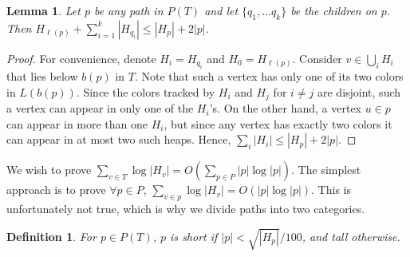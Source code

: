 \documentclass[11pt]{article}
\newcommand{\ignore}[1]{}
\newtheorem{lemma}[theorem]{Lemma}
\newtheorem{definition}[theorem]{Definition}
\theoremstyle{definition}
\newtheorem{observation}{Observation}
\begin{document}
\begin{lemma}
\label{lem:adjacent}
 Let $p$ be any path in $P(T)$ and let $\{q_1, \dots q_k\}$ be the children on $p$.
Then $H_{\ell(p)} + \sum_{i=1}^k |H_{q_i}| \leq |H_p|+2|p|$. 
\end{lemma}

\begin{proof} For convenience, denote $H_i = H_{q_i}$ and $H_0 = H_{\ell(p)}$.
Consider $v \in \bigcup_{i} H_i$ that lies below $b(p)$ in $T$. 
Note that such a vertex has only one of its two colors in $L(b(p))$.  
Since the colors tracked by $H_i$ and $H_j$ for $i\neq j$ are disjoint, 
such a vertex can appear in only one of the $H_i$'s.
On the other hand, a vertex $u\in p$ can appear in more than one $H_i$, 
but since any vertex has exactly two colors it can appear in at most two 
such heaps.  Hence, $\sum_i |H_i| \leq |H_p| + 2|p|$.
\ignore{
 First observe that for all $i$, $r_{i}$ lies above $r_p$ on some root to leaf path. 
 Let $H_i'$ be the subset of $H_i$ that lies below $r_p$.  Observe that $H_i'\subseteq H_p$, as $L(T_{r_i})\subseteq L(T_{r_p})$.
  
 Now for any $i\neq j$, $H_i \cap H_j = \emptyset$, as $r_{i}$ and $r_{j}$ are not on the same root to leaf path (i.e. $L(T_{r_i}) \cap L(T_{r_j}) = \emptyset$).
 In particular, $(H_i\setminus H_i') \cap (H_j \setminus H_j') = \emptyset$, and so $\sum_{i=0}^k |H_i\setminus H_i'| \leq |p|$ 
 as $H_i\setminus H_i'$ is precisely the subset of $H_i$ that lies on $p$.
 Moreover, for any $i\neq j$, $ H_i' \cap H_j' = \emptyset$, and so since $H_i'\subseteq H_p$ we have $\sum_{i=0}^k |H_i'|\leq |H_p|$.
 Putting these together gives
 \[
  \sum_{i=0}^k |H_i| = \sum_{i=0}^k |H_i'| + \sum_{i=0}^k |H_i\setminus H_i'| \leq |H_p|+|p|.
 \]
}
\end{proof}



We wish to prove $\sum_{v\in T} \log |H_v| = O(\sum_{p\in P} |p| \log |p|)$. 
The simplest approach is to prove $\forall p\in P$, $\sum_{v\in p} \log |H_v|= O(|p|\log|p|)$.
This is unfortunately not true, which is why we divide paths into two categories.

\begin{definition}
 For $p\in P(T)$, $p$ is \emph{short} if $|p| < \sqrt{|H_{p}|}/100$, and \emph{tall} otherwise.
\end{definition}

\ignore{
\begin{observation}
\label{obs:decrease}
 Let $v$ be a vertex in $T$ and let $w$ be its parent.  Then $|H_w| \geq |H_v| -1$, as $L(T_v) \subseteq L(T_w)$ and the path from 
 $w$ to the root has one less vertex than the path from $v$ to the root.
 In particular, we have the following more general property.
 Let $v$ and $u$ be any two vertices in the same root to leaf path of $T$, such that $v$ is a descendant of $u$.  
 Then $|H_v| \leq |H_u| + d(u,v)$. 
\end{observation}

The following can be thought of as a generalization of the above observation, and will be useful in later sections.
}
\end{document}
